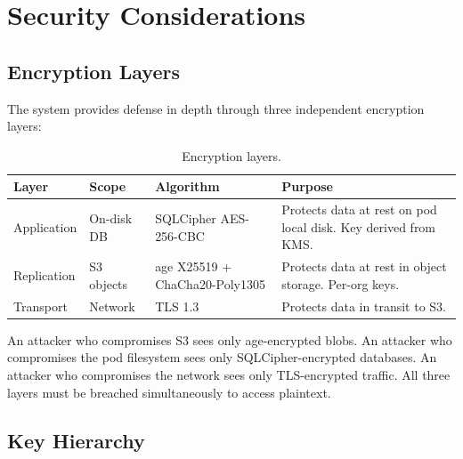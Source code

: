 \documentclass[11pt,a4paper]{article}
\begin{document}
\section{Security Considerations}\label{sec:security}

\subsection{Encryption Layers}

The system provides defense in depth through three independent
encryption layers:

\begin{table}[H]
\centering
\caption{Encryption layers.}
\label{tab:encryption}
\begin{tabular}{@{}lllp{5cm}@{}}
\toprule
\textbf{Layer} & \textbf{Scope} & \textbf{Algorithm} & \textbf{Purpose} \\
\midrule
Application & On-disk DB & SQLCipher AES-256-CBC & Protects data at rest
  on pod local disk. Key derived from KMS. \\
Replication & S3 objects & age X25519 + ChaCha20-Poly1305 & Protects
  data at rest in object storage. Per-org keys. \\
Transport & Network & TLS 1.3 & Protects data in transit to S3. \\
\bottomrule
\end{tabular}
\end{table}

An attacker who compromises S3 sees only age-encrypted blobs. An
attacker who compromises the pod filesystem sees only
SQLCipher-encrypted databases. An attacker who compromises the network
sees only TLS-encrypted traffic. All three layers must be breached
simultaneously to access plaintext.

\subsection{Key Hierarchy}\label{sec:key-hierarchy}
\end{document}
